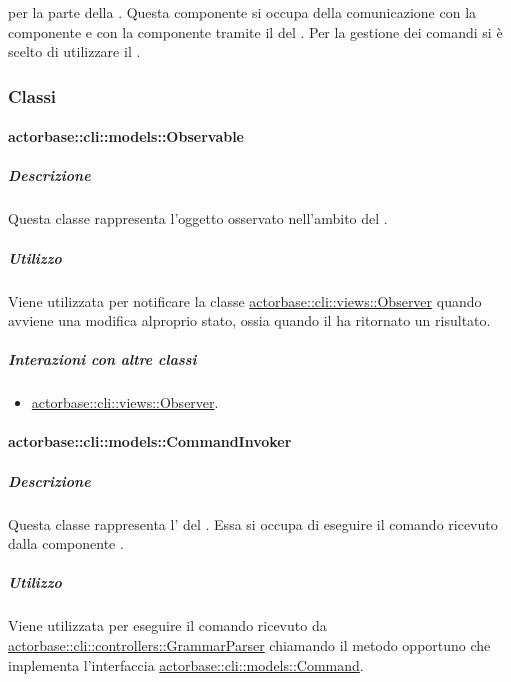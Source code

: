 \documentclass{scalatekids-article}
\begin{document}
 per la parte  della . Questa
componente si occupa della comunicazione con la componente  e
con la componente  tramite il  del  . Per la gestione dei comandi si è scelto di
utilizzare il .

\subsubsection{Classi}

\paragraph{actorbase::cli::models::Observable}
\label{sec:actorbase::cli::models::Observable}

\subparagraph{Descrizione}

Questa classe rappresenta l'oggetto osservato nell'ambito del  .

\subparagraph{Utilizzo}

Viene utilizzata per notificare la classe \hyperref[sec:actorbase::cli::views::Observer]{actorbase::cli::views::Observer}
quando avviene una modifica alproprio stato, ossia quando il 
ha ritornato un risultato.

\subparagraph{Interazioni con altre classi}

\begin{itemize}
\item \hyperref[sec:actorbase::cli::views::Observer]{actorbase::cli::views::Observer}.
\end{itemize}

\paragraph{actorbase::cli::models::CommandInvoker}
\label{sec:actorbase::cli::models::CommandInvoker}

\subparagraph{Descrizione}

Questa classe rappresenta l' del . Essa
si occupa di eseguire il comando ricevuto dalla componente .

\subparagraph{Utilizzo}

Viene utilizzata per eseguire il comando ricevuto da
\hyperref[sec:actorbase::cli::controllers::GrammarParser]{actorbase::cli::controllers::GrammarParser} chiamando il metodo opportuno che
implementa l'interfaccia \hyperref[sec:actorbase::cli::models::Command]{actorbase::cli::models::Command}.
\end{document}
